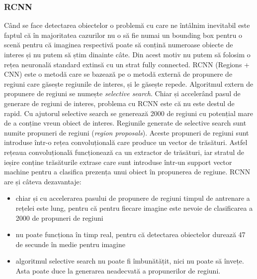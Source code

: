 \subsubsection{RCNN}
Când se face detectarea obiectelor o problemă cu care ne întâlnim inevitabil este faptul că în majoritatea cazurilor nu o să fie numai un bounding box pentru o scenă pentru că imaginea respectivă poate să conțină numeroase obiecte de interes și nu putem să știm dinainte câte. Din acest motiv nu putem să folosim o rețea neuronală standard extinsă cu un strat fully connected.\newline
RCNN (Regions + CNN) este o metodă care se bazează pe o metodă externă de propunere de regiuni care găsește regiunile de interes, și le găsește repede. Algoritmul extern de propunere de regiuni se numește \textit{selective search}.\newline
Chiar și accelerând pasul de generare de regiuni de interes, problema cu RCNN este că nu este destul de rapid.\newline
Cu ajutorul selective search se generează 2000 de regiuni cu potențial mare de a conține vreun obiect de interes. Regiunile generate de selective search sunt numite propuneri de regiuni (\textit{region proposals}). Aceste propuneri de regiuni sunt introduse într-o rețea convoluțională care produce un vector de trăsături. Astfel rețeaua convoluțională funcționează ca un extractor de trăsături, iar stratul de ieșire conține trăsăturile extrase care sunt introduse într-un support vector machine pentru a clasifica prezența unui obiect în propunerea de regiune.\newline
RCNN are și câteva dezavantaje:
\begin{itemize}
	\item chiar și cu accelerarea pasului de propunere de regiuni timpul de antrenare a rețelei este lung, pentru că pentru fiecare imagine este nevoie de clasificarea a 2000 de propuneri de regiuni
	\item nu poate funcționa în timp real, pentru că detectarea obiectelor durează 47 de secunde în medie pentru imagine
	\item algoritmul selective search nu poate fi îmbunătățit, nici nu poate să învețe. Asta poate duce la generarea neadecvată a propunerilor de regiuni.
\end{itemize}

